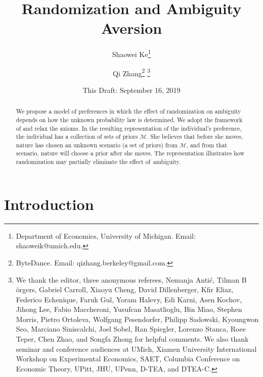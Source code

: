 \documentclass[12pt, notitlepage]{article}
\begin{document}
\title{Randomization and Ambiguity Aversion}
\date{This Draft: September 16, 2019}
\author{Shaowei Ke\thanks{%
Department of Economics, University of Michigan. Email: shaoweik@umich.edu.}
\and Qi Zhang\thanks{%
ByteDance. Email: qizhang.berkeley@gmail.com.} \thanks{%
We thank the editor, three anonymous referees, Nemanja Anti\'{c}, Tilman B%
\"{o}rgers, Gabriel Carroll, Xiaoyu Cheng, David Dillenberger, Kfir Eliaz,
Federico Echenique, Faruk Gul, Yoram Halevy, Edi Karni, Asen Kochov, Jihong
Lee, Fabio Maccheroni, Yusufcan Masatlioglu, Bin Miao, Stephen Morris,
Pietro Ortoleva, Wolfgang Pesendorfer, Philipp Sadowski, Kyoungwon Seo,
Marciano Siniscalchi, Joel Sobel, Ran Spiegler, Lorenzo Stanca, Roee Teper,
Chen Zhao, and Songfa Zhong for helpful comments. We also thank seminar and
conference audiences at UMich, Xiamen University International Workshop
on Experimental Economics, SAET, Columbia Conference on Economic Theory,
UPitt, JHU, UPenn, D-TEA, and DTEA-C.}}
\maketitle

\begin{abstract}
We propose a model of preferences in which the effect of randomization on
ambiguity depends on how the unknown probability law is determined. We adopt
the framework of \cite{AA63} and relax the axioms. In the resulting
representation of the individual's preference, the individual has a
collection of sets of priors $\mathcal{M}$. She believes that before she
moves, nature has chosen an unknown scenario (a set of priors) from $%
\mathcal{M}$, and from that scenario, nature will choose a prior after she
moves. The representation illustrates how randomization may partially
eliminate the effect of\ ambiguity.
\end{abstract}

\vskip1cm

\thispagestyle{empty}

\clearpage

\setcounter{page}{1}

\section{Introduction}
\end{document}
